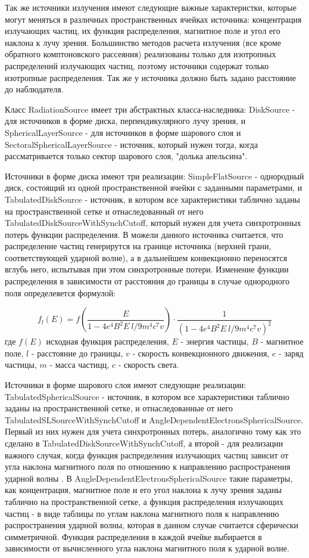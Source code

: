 Так же источники излучения имеют следующие важные характеристки, которые могут меняться в различных пространственных ячейках источника: концентрация излучающих частиц, их функция распределения, магнитное поле и угол его наклона к лучу зрения. Большинство методов расчета излучения (все кроме обратного комптоновского рассеяния) реализованы только для изотропных распределений излучающих частиц, поэтому источники содержат только изотропные распределения. Так же у источника должно быть задано расстояние до наблюдателя.

Класс RadiationSource имеет три абстрактных класса-наследника: DiskSource - для источников в форме диска, перпендикулярного лучу зрения, и SphericalLayerSource - для источников в форме шарового слоя и SectoralSphericalLayerSource - источник, который нужен тогда, когда рассматривается только сектор шарового слоя, "долька апельсина". 

Источники в форме диска имеют три реализации: SimpleFlatSource - однородный диск, состоящий из одной пространственной ячейки с заданными параметрами, и TabulatedDiskSource - источник, в котором все характеристики таблично заданы на пространственной сетке и отнаследованный от него TabulatedDiskSourceWithSynchCutoff, который нужен для учета синхротронных потерь функции распределения. В можели данного источника считается, что распределение частиц генерирутся на границе источника (верхней грани, соответствующей ударной волне), а в дальнейшем конвекционно переносятся вглубь него, испытывая при этом синхротронные потери. Изменение функции распределения в зависимости от расстояния до границы в случае однородного поля определеяется формулой:

\begin{equation}
	f_l(E)=f\left(\frac{E}{1-4e^4 B^2 E~l/9m^4 c^7 v}\right)\cdot\frac{1}{\left(1-4e^4 B^2 E~l/9m^4 c^7 v\right)^2}
\end{equation}
где $f(E)$ исходная функция распределения, $E$ - энергия частицы, $B$ - магнитное поле, $l$ - расстояние до границы, $v$ - скорость конвекционного движения, $e$ - заряд частицы, $m$ - масса частицц, $c$ - скорость света.

Источники в форме шарового слоя имеют следующие реализации: TabulatedSphericalSource - источник, в котором все характеристики таблично заданы на пространственной сетке, и отнаследованные от него  TabulatedSLSourceWithSynchCutoff и AngleDependentElectronsSphericalSource. Первый из них нужен для учета синхротронных потерь, аналогично тому как это сделано в TabulatedDiskSourceWithSynchCutoff, а второй - для реализации важного случая, когда функция распределения излучающих частиц зависит от угла наклона магнитного поля по отношению к направлению распространения ударной волны \cite{SironiSpitkovsky2009pair, GuoSironi2014_1,Crumley2019, Romansky2018, еще}. В AngleDependentElectronsSphericalSource такие параметры, как концентрация, магнитное поле и его угол наклона к лучу зрения заданы таблично на пространственной сетке, а функция распределения излучающих частиц - в виде таблицы по углам наклона магнитного поля к направлению распространения ударной волны, которая в данном случае считается сферически симметричной. Функция распределения в каждой ячейке выбирается в зависимости от вычисленного угла наклона магнитного поля к ударной волне.

